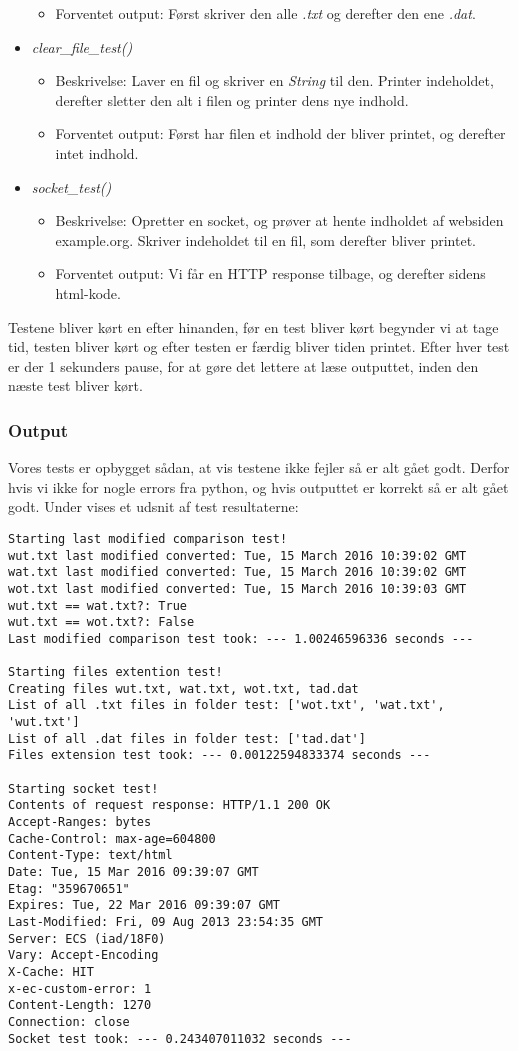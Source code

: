 \documentclass[11pt]{article}
\begin{document}
\begin{itemize}
\begin{itemize}
  \item Forventet output: Først skriver den alle \textit{.txt} og derefter den ene \textit{.dat}.
  \end{itemize}
\item \textit{clear\_file\_test()}
  \begin{itemize}
  \item Beskrivelse: Laver en fil og skriver en \textit{String} til den. Printer indeholdet, derefter sletter den alt i filen og printer dens nye indhold.
  \item Forventet output: Først har filen et indhold der bliver printet, og derefter intet indhold.
  \end{itemize}
\item \textit{socket\_test()}
  \begin{itemize}
  \item Beskrivelse: Opretter en socket, og prøver at hente indholdet af websiden example.org. Skriver indeholdet til en fil, som derefter bliver printet.
  \item Forventet output: Vi får en HTTP response tilbage, og derefter sidens html-kode.
  \end{itemize}
\end{itemize}
Testene bliver kørt en efter hinanden, før en test bliver kørt begynder vi at tage tid, testen bliver kørt og efter testen er færdig bliver tiden printet. Efter hver test er der 1 sekunders pause, for at gøre det lettere at læse outputtet, inden den næste test bliver kørt.
\subsubsection{Output}

Vores tests er opbygget sådan, at vis testene ikke fejler så er alt gået godt. Derfor hvis vi ikke for nogle errors fra python, og hvis outputtet er korrekt så er alt gået godt.
Under vises et udsnit af test resultaterne:
\begin{verbatim}
Starting last modified comparison test!
wut.txt last modified converted: Tue, 15 March 2016 10:39:02 GMT
wat.txt last modified converted: Tue, 15 March 2016 10:39:02 GMT
wot.txt last modified converted: Tue, 15 March 2016 10:39:03 GMT
wut.txt == wat.txt?: True
wut.txt == wot.txt?: False
Last modified comparison test took: --- 1.00246596336 seconds ---

Starting files extention test!
Creating files wut.txt, wat.txt, wot.txt, tad.dat
List of all .txt files in folder test: ['wot.txt', 'wat.txt', 'wut.txt']
List of all .dat files in folder test: ['tad.dat']
Files extension test took: --- 0.00122594833374 seconds ---

Starting socket test!
Contents of request response: HTTP/1.1 200 OK
Accept-Ranges: bytes
Cache-Control: max-age=604800
Content-Type: text/html
Date: Tue, 15 Mar 2016 09:39:07 GMT
Etag: "359670651"
Expires: Tue, 22 Mar 2016 09:39:07 GMT
Last-Modified: Fri, 09 Aug 2013 23:54:35 GMT
Server: ECS (iad/18F0)
Vary: Accept-Encoding
X-Cache: HIT
x-ec-custom-error: 1
Content-Length: 1270
Connection: close
Socket test took: --- 0.243407011032 seconds ---

\end{verbatim}
\end{document}
